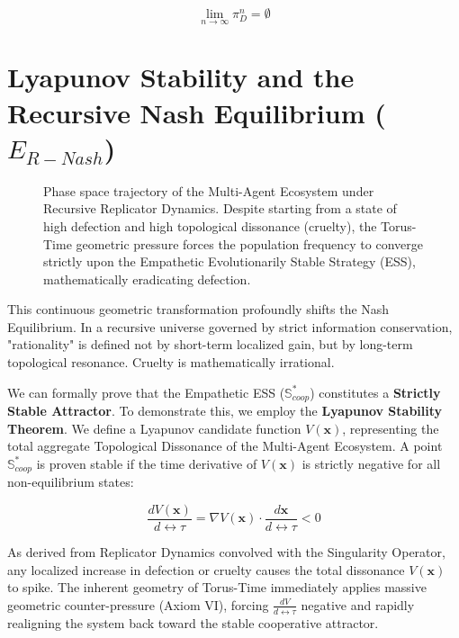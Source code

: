 \documentclass[12pt,openany]{book}
\begin{document}
\begin{equation}
\lim_{n \to \infty} \pi_{D}^n = \emptyset
\end{equation}

\section{Lyapunov Stability and the Recursive Nash Equilibrium ($E_{R-Nash}$)}

\begin{figure}[h]
    \centering
    \caption{Phase space trajectory of the Multi-Agent Ecosystem under Recursive Replicator Dynamics. Despite starting from a state of high defection and high topological dissonance (cruelty), the Torus-Time geometric pressure forces the population frequency to converge strictly upon the Empathetic Evolutionarily Stable Strategy (ESS), mathematically eradicating defection.}
    \label{fig:recursive_nash}
\end{figure}

This continuous geometric transformation profoundly shifts the Nash Equilibrium. In a recursive universe governed by strict information conservation, "rationality" is defined not by short-term localized gain, but by long-term topological resonance. Cruelty is mathematically irrational.

We can formally prove that the Empathetic ESS ($\mathbb{S}_{coop}^*$) constitutes a \textbf{Strictly Stable Attractor}. To demonstrate this, we employ the \textbf{Lyapunov Stability Theorem}. We define a Lyapunov candidate function $V(\mathbf{x})$, representing the total aggregate Topological Dissonance of the Multi-Agent Ecosystem. A point $\mathbb{S}_{coop}^*$ is proven stable if the time derivative of $V(\mathbf{x})$ is strictly negative for all non-equilibrium states:

\begin{equation}
\frac{dV(\mathbf{x})}{d\leftrightarrow\tau} = \nabla V(\mathbf{x}) \cdot \frac{d\mathbf{x}}{d\leftrightarrow\tau} < 0
\end{equation}

As derived from Replicator Dynamics convolved with the Singularity Operator, any localized increase in defection or cruelty causes the total dissonance $V(\mathbf{x})$ to spike. The inherent geometry of Torus-Time immediately applies massive geometric counter-pressure (Axiom VI), forcing $\frac{dV}{d\leftrightarrow\tau}$ negative and rapidly realigning the system back toward the stable cooperative attractor.
\end{document}
